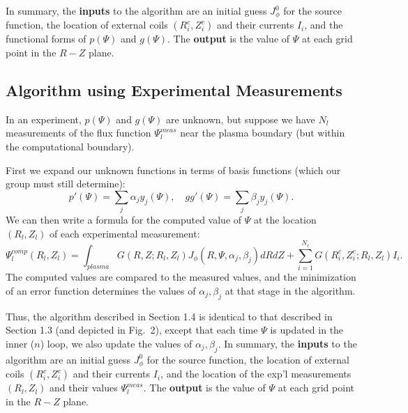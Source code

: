 \documentclass[paper=a4, fontsize=11pt]{scrartcl} %
\begin{document}
In summary, the \textbf{inputs} to the algorithm are an initial guess $J_\phi^0$ for the source function, the location of external coils $(R_i^c,Z_i^c)$ and their currents $I_i$, and the functional forms of $p(\Psi)$ and $g(\Psi)$.  The \textbf{output} is the value of $\Psi$ at each grid point in the $R-Z$ plane.  

\subsection{Algorithm using Experimental Measurements}

In an experiment, $p(\Psi)$ and $g(\Psi)$ are unknown, but suppose we have $N_l$ measurements of the flux function $\Psi_l^{meas}$ near the plasma boundary (but within the computational boundary).  

First we expand our unknown functions in terms of basis functions (which our group must still determine):
\begin{equation}
p'(\Psi) = \sum_j \alpha_j y_j(\Psi), \quad gg'(\Psi) = \sum_j \beta_j y_j(\Psi).
\end{equation}
We can then write a formula for the computed value of $\Psi$ at the location $(R_l, Z_l)$ of each experimental measurement: 
\begin{equation}
\Psi_l^{comp}(R_l, Z_l) = \int_{plasma} G(R,Z; R_l,Z_l) J_\phi(R,\Psi,\alpha_j,\beta_j) dR dZ + \sum_{i=1}^{N_c} G(R_i^c,Z_i^c; R_l,Z_l) I_i.
\end{equation}
The computed values are compared to the measured values, and the minimization of an error function determines the values of $\alpha_j, \beta_j$ at that stage in the algorithm.   

Thus, the algorithm described in Section 1.4 is identical to that described in Section 1.3 (and depicted in Fig.~2), except that each time $\Psi$ is updated in the inner ($n$) loop, we also update the values of $\alpha_j, \beta_j$.  In summary, the \textbf{inputs} to the algorithm are an initial guess $J_\phi^0$ for the source function, the location of external coils $(R_i^c,Z_i^c)$ and their currents $I_i$, and the location of the exp'l measurements $(R_l,Z_l)$ and their values $\Psi_l^{meas}$.  The \textbf{output} is the value of $\Psi$ at each grid point in the $R-Z$ plane.  



\end{document}
